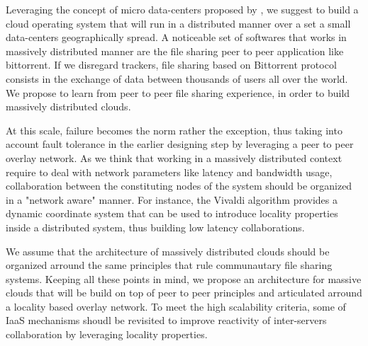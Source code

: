 Leveraging the concept of micro data-centers proposed by \cite{greenberg:2008},
we suggest to build a cloud operating system that will run in a distributed
manner over a set a small data-centers geographically spread. A noticeable set
of softwares that works in massively distributed manner are the file sharing
peer to peer application like bittorrent. If we disregard trackers, file sharing
based on Bittorrent protocol consists in the exchange of data between thousands
of users all over the world. We propose to learn from peer to peer file sharing
experience, in order to build massively distributed clouds.

At this scale, failure becomes the norm rather the exception, thus taking into 
account fault tolerance in the earlier designing step by leveraging a peer to 
peer overlay network. As we think that working in a massively distributed 
context require to deal with network parameters like latency and bandwidth 
usage, collaboration between the constituting nodes of the system should be
organized in a "network aware" manner. For instance, the Vivaldi algorithm 
\cite{dabek:2004:vivaldi} provides a dynamic coordinate system that can be used
to introduce locality properties inside a distributed system, thus building low
latency collaborations.

We assume that the architecture of massively distributed clouds should be 
organized arround the same principles that rule communautary file sharing 
systems. Keeping all these points in mind, we propose an architecture for 
massive clouds that will be build on top of peer to peer principles and 
articulated arround a locality based overlay network. To meet the high 
scalability criteria, some of IaaS mechanisms shoudl be revisited to improve
reactivity of inter-servers collaboration by leveraging locality properties.



